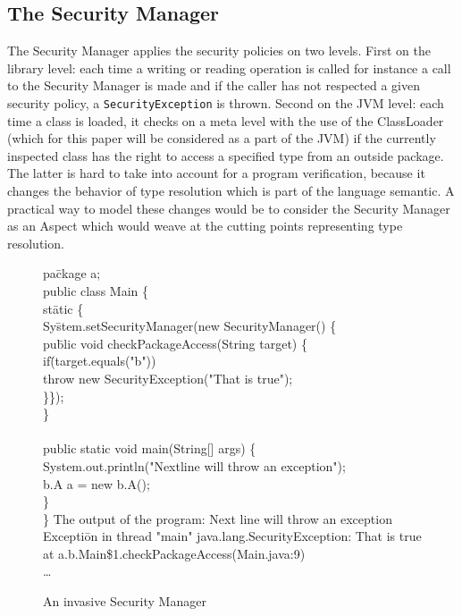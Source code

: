 \subsection{The Security Manager}
The Security Manager applies the security policies on two
levels. First on the library level: each time a writing or reading
operation is called for instance a call to the Security Manager is
made and if the caller has not respected a given security policy, a
{\tt SecurityException} is thrown.
Second on the JVM level: each time a class is
loaded, it checks on a meta level with the use of the ClassLoader
(which for this paper will be considered as a part of the JVM) if the
currently inspected class has the right to access a specified type
from an outside package.  
The latter is hard to take into account for a program verification, 
because it changes the behavior of type resolution which is part
of the language semantic.  A practical way to
model these changes would be to consider the Security Manager as an
Aspect which would weave at the cutting points representing type
resolution.
\vspace{-0.4cm}
\begin{figure}
\bcode
pa\=ckage a;\\
public class Main \{\+\\
  st\=atic \{\+\\
    Sy\=stem.setSecurityManager(new SecurityManager() \{\+\\
      pu\=blic void checkPackageAccess(String target) \{\+\\
        if\=(target.equals("b"))\\
          \>throw new SecurityException("That is true");\\
      \}\});\-\-\\
  \}\\
 \\
  public static void main(String[] args) \{\+\\
    System.out.println("Nextline will throw an exception");\\
    b.A a = new b.A();\-\\
  \}\-\\
\}
\ecode
The output of the program:
\bcode
Next line will throw an exception\\
Excepti\=on in thread "main" java.lang.SecurityException: That is true\+\\
	at a.b.Main\$1.checkPackageAccess(Main.java:9)\\
	\dots
\ecode
\caption{An invasive Security Manager}
\end{figure}

